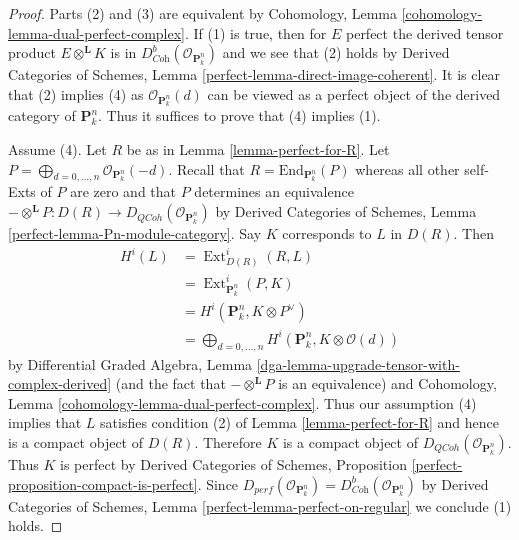 \documentclass{stacks-project}
\theoremstyle{plain}
\theoremstyle{definition}
\theoremstyle{remark}
\numberwithin{equation}{subsection}
\def\Ext{\mathop{\mathrm{Ext}}\nolimits}
\def\QCoh{\mathit{QCoh}}
\begin{document}
\begin{proof}
Parts (2) and (3) are equivalent by
Cohomology, Lemma \ref{cohomology-lemma-dual-perfect-complex}.
If (1) is true, then for $E$ perfect the derived tensor product
$E \otimes^\mathbf{L} K$ is in
$D^b_{\textit{Coh}}(\mathcal{O}_{\mathbf{P}^n_k})$
and we see that (2) holds by 
Derived Categories of Schemes, Lemma \ref{perfect-lemma-direct-image-coherent}.
It is clear that (2) implies (4) as $\mathcal{O}_{\mathbf{P}^n_k}(d)$
can be viewed
as a perfect object of the derived category of $\mathbf{P}^n_k$.
Thus it suffices to prove that (4) implies (1).

\medskip\noindent
Assume (4). Let $R$ be as in Lemma \ref{lemma-perfect-for-R}.
Let $P = \bigoplus_{d = 0, \ldots, n} \mathcal{O}_{\mathbf{P}^n_k}(-d)$.
Recall that $R = \text{End}_{\mathbf{P}^n_k}(P)$ whereas all other
self-Exts of $P$ are zero and that $P$ determines an equivalence
$- \otimes^\mathbf{L} P : D(R) \to D_\QCoh(\mathcal{O}_{\mathbf{P}^n_k})$
by Derived Categories of Schemes, Lemma \ref{perfect-lemma-Pn-module-category}.
Say $K$ corresponds to $L$ in $D(R)$. Then
\begin{align*}
H^i(L)
& =
\Ext^i_{D(R)}(R, L) \\
& =
\Ext^i_{\mathbf{P}^n_k}(P, K) \\
& =
H^i(\mathbf{P}^n_k, K \otimes P^\vee) \\
& =
\bigoplus\nolimits_{d = 0, \ldots, n}
H^i(\mathbf{P}^n_k, K \otimes \mathcal{O}(d))
\end{align*}
by Differential Graded Algebra, Lemma
\ref{dga-lemma-upgrade-tensor-with-complex-derived}
(and the fact that $- \otimes^\mathbf{L} P$ is an equivalence)
and Cohomology, Lemma \ref{cohomology-lemma-dual-perfect-complex}.
Thus our assumption (4) implies that $L$ satisfies condition (2) of
Lemma \ref{lemma-perfect-for-R} and hence is a compact object of $D(R)$.
Therefore $K$ is a compact object of
$D_\QCoh(\mathcal{O}_{\mathbf{P}^n_k})$.
Thus $K$ is perfect by
Derived Categories of Schemes, Proposition
\ref{perfect-proposition-compact-is-perfect}.
Since $D_{perf}(\mathcal{O}_{\mathbf{P}^n_k}) =
D^b_{\textit{Coh}}(\mathcal{O}_{\mathbf{P}^n_k})$
by
Derived Categories of Schemes, Lemma \ref{perfect-lemma-perfect-on-regular}
we conclude (1) holds.
\end{proof}
\end{document}
